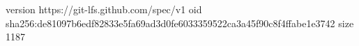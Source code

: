 version https://git-lfs.github.com/spec/v1
oid sha256:de81097b6edf82833e5fa69ad3d0fe6033359522ca3a45f90c8f4ffabe1e3742
size 1187
